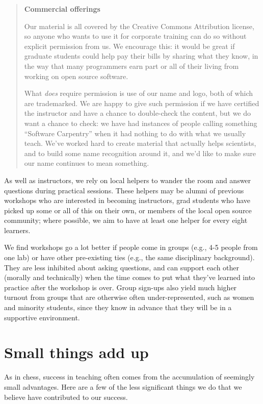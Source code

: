\documentclass[10pt,a4paper,twocolumn]{article}
\begin{document}
\begin{quote}
\textbf{Commercial offerings}

Our material \cite{swcsite,swcgithub} is all covered by the Creative
Commons Attribution license, so anyone who wants to use it for
corporate training can do so without explicit permission from us. We
encourage this: it would be great if graduate students could help pay
their bills by sharing what they know, in the way that many
programmers earn part or all of their living from working on open
source software.

What \emph{does} require permission is use of our name and logo, both
of which are trademarked. We are happy to give such permission if we
have certified the instructor and have a chance to double-check the
content, but we do want a chance to check: we have had instances of
people calling something ``Software Carpentry'' when it had nothing to
do with what we usually teach. We've worked hard to create material
that actually helps scientists, and to build some name recognition
around it, and we'd like to make sure our name continues to mean
something.
\end{quote}

As well as instructors, we rely on local helpers to wander the room
and answer questions during practical sessions. These helpers may be
alumni of previous workshops who are interested in becoming
instructors, grad students who have picked up some or all of this on
their own, or members of the local open source community; where
possible, we aim to have at least one helper for every eight learners.

We find workshops go a lot better if people come in groups (e.g., 4-5
people from one lab) or have other pre-existing ties (e.g., the same
disciplinary background). They are less inhibited about asking
questions, and can support each other (morally and technically) when
the time comes to put what they've learned into practice after the
workshop is over. Group sign-ups also yield much higher turnout from
groups that are otherwise often under-represented, such as women and
minority students, since they know in advance that they will be in a
supportive environment.

\section*{Small things add up}

As in chess, success in teaching often comes from the accumulation of
seemingly small advantages. Here are a few of the less significant
things we do that we believe have contributed to our success.
\end{document}
